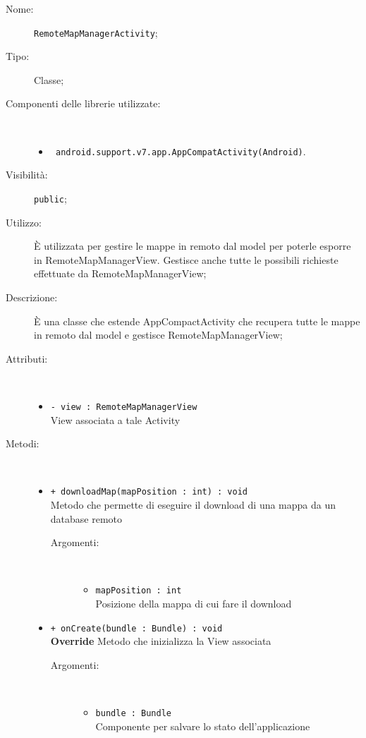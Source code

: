 \documentclass[../DefinizioneDiProdotto.tex]{subfiles}
\begin{document}
    \begin{description}
\item[Nome:] \texttt{RemoteMapManagerActivity};
\item[Tipo:] Classe;
\item[Componenti delle librerie utilizzate:] \
\begin{itemize}
\item \texttt{ android.support.v7.app.AppCompatActivity(Android)}.

\end{itemize}
\item[Visibilità:] \texttt{public};
\item[Utilizzo:] È utilizzata per gestire le mappe in remoto dal model per poterle esporre in RemoteMapManagerView. Gestisce anche tutte le possibili richieste effettuate da RemoteMapManagerView;
\item[Descrizione:] È una classe che estende AppCompactActivity che recupera tutte le mappe in remoto dal model e gestisce RemoteMapManagerView;
\item[Attributi:] \
\begin{itemize}
\item \texttt{- view : RemoteMapManagerView}\\
View associata a tale Activity

\end{itemize}
\item[Metodi:] \
\begin{itemize}
\item \texttt{+ downloadMap(mapPosition : int) : void}\\
Metodo che permette di eseguire il download di una mappa da un database remoto
 \begin{description}
\item[Argomenti:] \
\begin{itemize}
\item \texttt{mapPosition : int}\\
Posizione della mappa di cui fare il download\end{itemize}
\end{description}
\item \texttt{+ onCreate(bundle : Bundle) : void}\\
\textbf{Override} Metodo che inizializza la View associata
 \begin{description}
\item[Argomenti:] \
\begin{itemize}
\item \texttt{bundle : Bundle}\\
Componente per salvare lo stato dell'applicazione\end{itemize}
\end{description}
\end{itemize}
\end{description}
\end{document}
